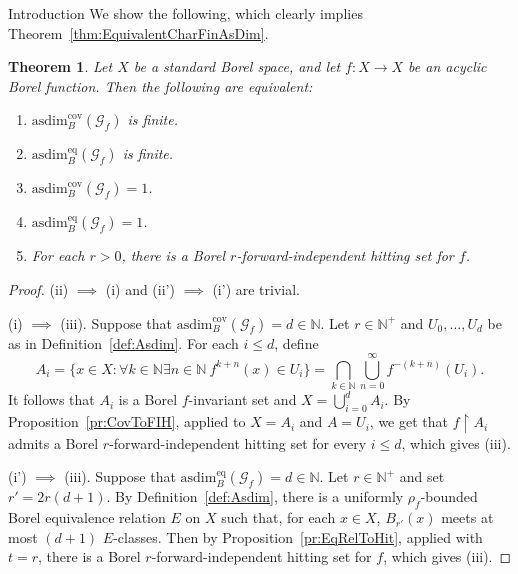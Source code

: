 \documentclass[psamsfonts]{amsart}
\newtheorem{thm}{Theorem}[section]
\theoremstyle{definition}
\newcommand{\N}{\mathbb N}
\newcommand{\asdim}{\text{asdim}}
\theoremstyle{remark}
\numberwithin{equation}{section}
\newcommand\mcal{\mathcal}
\begin{document}
\begin{section}{Introduction}
    We show the following, which clearly implies Theorem~\ref{thm:EquivalentCharFinAsDim}.
    
    \begin{thm}\label{thm:Equivalences}
        Let $X$ be a standard Borel space, and let $f : X \rightarrow X$ be an acyclic Borel function. Then the following are equivalent:
        \begin{enumerate}
            \item [(i)] $\asdim^{\text{cov}}_B(\mcal{G}_f)$ is finite.
            \item [(i')] $\asdim^{\text{eq}}_B(\mcal{G}_f)$ is finite.
            \item [(ii)] $\asdim^{\text{cov}}_B(\mcal{G}_f)= 1$.
            \item [(ii')] $\asdim^{\text{eq}}_B(\mcal{G}_f)= 1$.
            \item [(iii)] For each $r > 0$, there is a Borel $r$-forward-independent hitting set for $f$.
        \end{enumerate}
    \end{thm}
    \begin{proof}
    (ii) $\implies$ (i) and (ii') $\implies$ (i') are trivial.

    \medskip
    
    (i) $\implies$ (iii). Suppose that $\asdim^{\text{cov}}_B(\mathcal{G}_f)=d\in \N$.
    Let $r\in \N^+$ and $U_0,\dots,U_d$ be as in Definition~\ref{def:Asdim}.
    For each $i\le d$, define
    $$A_i=\{x\in X:\forall k\in \N \exists n\in \N \ f^{k+n}(x)\in U_i\}=\bigcap_{k\in \N}\bigcup_{n=0}^\infty f^{-(k+n)}(U_i).$$
    It follows that $A_i$ is a Borel $f$-invariant set and $X=\bigcup_{i=0}^d A_i$.
    By Proposition~\ref{pr:CovToFIH}, applied to $X=A_i$ and $A=U_i$, we get that $f\upharpoonright A_i$ admits a Borel $r$-forward-independent hitting set for every $i\le d$, which gives (iii).
    
    \medskip

    (i') $\implies$ (iii). Suppose that $\asdim^{\text{eq}}_B(\mcal{G}_f) = d \in \N$.
    Let $r \in \N^+$ and set $r' = 2r(d + 1)$.
    By Definition~\ref{def:Asdim}, there is a uniformly $\rho_f$-bounded Borel equivalence relation $E$ on $X$ such that, for each $x\in X$, $B_{r'}(x)$ meets at most $(d+1)$ $E$-classes.
    Then by Proposition~\ref{pr:EqRelToHit}, applied with $t=r$, there is a Borel $r$-forward-independent hitting set for $f$, which gives (iii).
    
    
    \medskip


\end{proof}
\end{section}
\end{document}
